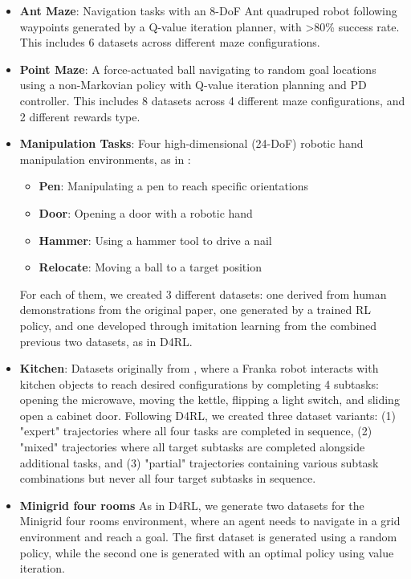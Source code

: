 \documentclass{article}
\begin{document}
\begin{itemize}
    \item  \textbf{Ant Maze}: Navigation tasks with an 8-DoF Ant quadruped robot following waypoints generated by a Q-value iteration planner, with >80\% success rate. This includes 6 datasets across different maze configurations.
    \item \textbf{Point Maze}: A force-actuated ball navigating to random goal locations using a non-Markovian policy with Q-value iteration planning and PD controller. This includes 8 datasets across 4 different maze configurations, and 2 different rewards type.
    \item \textbf{Manipulation Tasks}: Four high-dimensional (24-DoF) robotic hand manipulation environments, as in \cite{d4rl-pen}:
\begin{itemize}
    \item \textbf{Pen}: Manipulating a pen to reach specific orientations
    \item \textbf{Door}: Opening a door with a robotic hand
    \item \textbf{Hammer}: Using a hammer tool to drive a nail
    \item \textbf{Relocate}: Moving a ball to a target position
\end{itemize}
    For each of them, we created 3 different datasets: one derived from human demonstrations from the original paper, one generated by a trained RL policy, and one developed through imitation learning from the combined previous two datasets, as in D4RL.
    \item \textbf{Kitchen}: Datasets originally from \cite{relaypolicylearning}, where a Franka robot interacts with kitchen objects to reach desired configurations by completing 4 subtasks: opening the microwave, moving the kettle, flipping a light switch, and sliding open a cabinet door. Following D4RL, we created three dataset variants: (1) "expert" trajectories where all four tasks are completed in sequence, (2) "mixed" trajectories where all target subtasks are completed alongside additional tasks, and (3) "partial" trajectories containing various subtask combinations but never all four target subtasks in sequence.
    \item \textbf{Minigrid four rooms} As in D4RL, we generate two datasets for the Minigrid \cite{minigrid} four rooms environment, where an agent needs to navigate in a grid environment and reach a goal. The first dataset is generated using a random policy, while the second one is generated with an optimal policy using value iteration.
\end{itemize}
\end{document}
